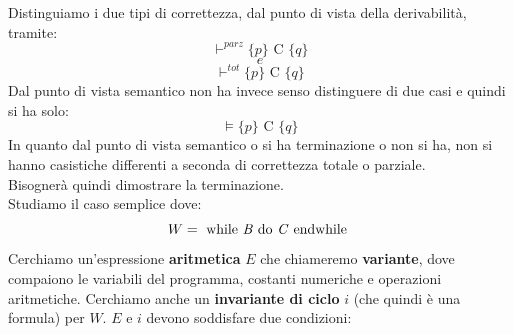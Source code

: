 				      				Distinguiamo i due tipi di correttezza, dal punto di vista della derivabilità,
				      				tramite: 
				      				\[\vdash^{parz}\{p\}\mbox{ C }\{q\}\]
				      				\[e\]
				      				\[\vdash^{tot}\{p\}\mbox{ C }\{q\}\]
				      				Dal punto di vista semantico non ha invece senso distinguere di due casi e
				      				quindi si ha solo:
				      				\[\vDash\{p\}\mbox{ C }\{q\}\]
				      				In quanto dal punto di vista semantico o si ha terminazione o non si ha, non si
				      				hanno casistiche differenti a seconda di correttezza totale o parziale.\\
				      				Bisognerà quindi dimostrare la terminazione.\\
				      				Studiamo il caso semplice dove:
				      				\[W=\mbox{ while \textit{B} do \textit{C} endwhile }\]
				      				Cerchiamo un'espressione \textbf{aritmetica} $E$ che chiameremo \textbf{variante}, dove compaiono le variabili del
				      				programma, costanti numeriche e operazioni aritmetiche. Cerchiamo anche un
				      				\textbf{invariante di ciclo} $i$ (che quindi è una formula) per $W$. $E$ e $i$
				      				devono soddisfare due condizioni:
